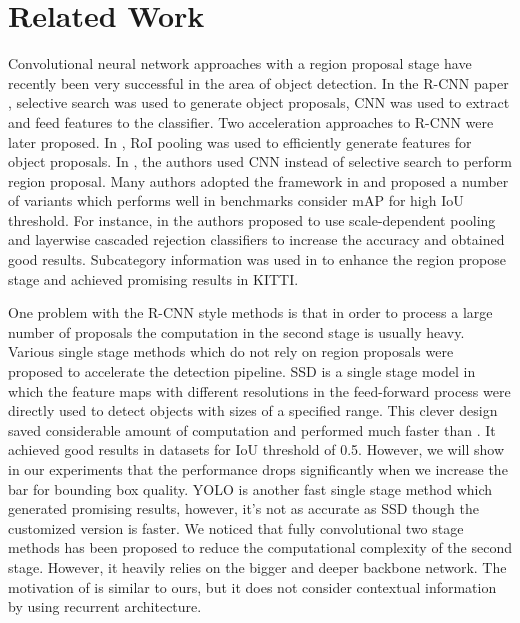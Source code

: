 \documentclass[10pt,twocolumn,letterpaper]{article}
\begin{document}
\section{Related Work}

Convolutional neural network approaches with a region proposal stage have recently been very successful in the area of object detection. In the R-CNN paper \cite{girshick14CVPR}, selective search \cite{Uijlings13} was used to generate object proposals, CNN was used to extract and feed features to the classifier. Two acceleration approaches to R-CNN were later proposed. In \cite{girshickICCV15fastrcnn}, RoI pooling was used to efficiently generate features for object proposals. In \cite{RenSQ16}, the authors used CNN instead of selective search to perform region proposal. Many authors adopted the framework in \cite{RenSQ16} and proposed a number of variants which performs well in benchmarks consider mAP for high IoU threshold. For instance, in \cite{Yang16} the authors proposed to use scale-dependent pooling and layerwise cascaded rejection classifiers to increase the accuracy and obtained good results. Subcategory information was used in \cite{Xiang16} to enhance the region propose stage and achieved promising results in KITTI.

One problem with the R-CNN style methods is that in order to process a large number of proposals the computation in the second stage is usually heavy. Various single stage methods which do not rely on region proposals were proposed to accelerate the detection pipeline. SSD \cite{liu15ssd} is a single stage model in which the feature maps with different resolutions in the feed-forward process were directly used to detect objects with sizes of a specified range. This clever design saved considerable amount of computation and performed much faster than \cite{RenSQ16}. It achieved good results in datasets for IoU threshold of 0.5. However, we will show in our experiments that the performance drops significantly when we increase the bar for bounding box quality. YOLO \cite{Redmon16} is another fast single stage method which generated promising results, however, it's not as accurate as SSD though the customized version is faster. We noticed that fully convolutional two stage methods \cite{Dai16} has been proposed to reduce the computational complexity of the second stage. However, it heavily relies on the bigger and deeper backbone network. The motivation of \cite{Gidaris16} is similar to ours, but it does not consider contextual information by using recurrent architecture.
\end{document}
